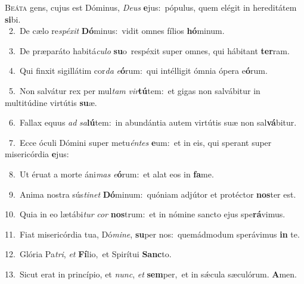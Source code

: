 \lettrine{\initial\textcolor{\initialcolor}{B}}{eáta} gens, cujus est Dóminus, \textit{De}\-\textit{us} \textbf{e}\-jus:~\star pópulus, quem elégit in hereditátem \textbf{si}\-bi.\\
{\numbfont\textcolor{\numbcolor}{~2.}}~De cælo re\-\textit{spé}\-\textit{xit} \textbf{Dó}\-minus:~\star vidit omnes fílios \textbf{hó}\-minum.\par
{\numbfont\textcolor{\numbcolor}{~3.}}~De præparáto habitá\-\textit{cu}\-\textit{lo} \textbf{su}\-o~\star respéxit super omnes, qui hábitant \textbf{ter}\-ram.\par
{\numbfont\textcolor{\numbcolor}{~4.}}~Qui finxit sigillátim cor\textit{da} \textit{e}\-\textbf{ó}rum:~\star qui intélligit ómnia ópera e\-\textbf{ó}\-rum.\par
{\numbfont\textcolor{\numbcolor}{~5.}}~Non salvátur rex per mul\textit{tam} \textit{vir}\-\textbf{tú}tem:~\star et gigas non salvábitur in multitúdine virtútis \textbf{su}\-æ.\par
{\numbfont\textcolor{\numbcolor}{~6.}}~Fallax equus \textit{ad} \textit{sa}\-\textbf{lú}tem:~\star in abundántia autem virtútis suæ non sal\-\textbf{vá}\-bitur.\par
{\numbfont\textcolor{\numbcolor}{~7.}}~Ecce óculi Dómini super metu\-\textit{én}\-\textit{tes} \textbf{e}\-um:~\star et in eis, qui sperant super misericórdia \textbf{e}\-jus:\par
{\numbfont\textcolor{\numbcolor}{~8.}}~Ut éruat a morte áni\textit{mas} \textit{e}\-\textbf{ó}rum:~\star et alat eos in \textbf{fa}\-me.\par
{\numbfont\textcolor{\numbcolor}{~9.}}~Anima nostra sús\-\textit{ti}\-\textit{net} \textbf{Dó}\-minum:~\star quóniam adjútor et protéctor \textbf{nos}\-ter est.\par
{\numbfont\textcolor{\numbcolor}{10.}}~Quia in eo lætábi\textit{tur} \textit{cor} \textbf{nos}\-trum:~\star et in nómine sancto ejus spe\-\textbf{rá}\-vimus.\par
{\numbfont\textcolor{\numbcolor}{11.}}~Fiat misericórdia tua, Dó\-\textit{mi}\-\textit{ne}, \textbf{su}\-per nos:~\star quemádmodum sperávimus \textbf{in} te.\par
{\numbfont\textcolor{\numbcolor}{12.}}~Glória Pa\-\textit{tri}\-, \textit{et} \textbf{Fí}\-lio,~\star et Spirítui \textbf{Sanc}\-to.\par
{\numbfont\textcolor{\numbcolor}{13.}}~Sicut erat in princípio, et \textit{nunc}\-, \textit{et} \textbf{sem}\-per,~\star et in sǽcula sæculórum. \textbf{A}\-men.\par
